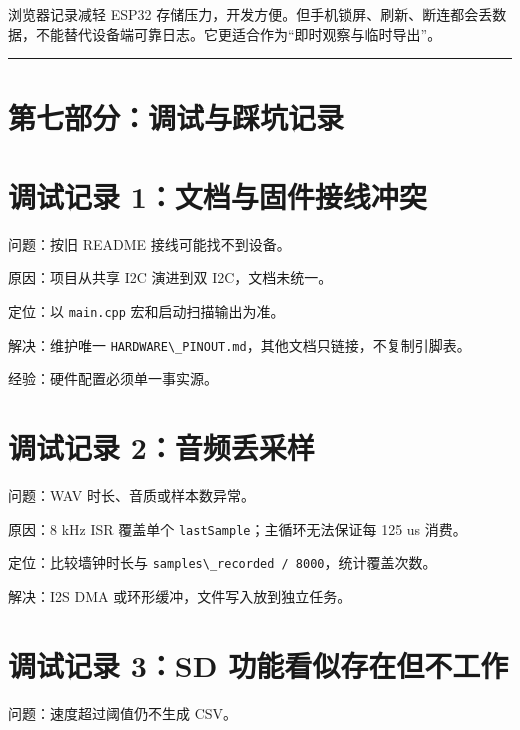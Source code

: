\documentclass[
  UTF8,11pt,a4paper]{ctexart}
\newcommand{\passthrough}[1]{#1}
\begin{document}
浏览器记录减轻 ESP32
存储压力，开发方便。但手机锁屏、刷新、断连都会丢数据，不能替代设备端可靠日志。它更适合作为``即时观察与临时导出''。

\begin{center}\rule{0.5\linewidth}{0.5pt}\end{center}

\section{第七部分：调试与踩坑记录}\label{ux7b2cux4e03ux90e8ux5206ux8c03ux8bd5ux4e0eux8e29ux5751ux8bb0ux5f55}

\section{调试记录
1：文档与固件接线冲突}\label{ux8c03ux8bd5ux8bb0ux5f55-1ux6587ux6863ux4e0eux56faux4ef6ux63a5ux7ebfux51b2ux7a81}

问题：按旧 README 接线可能找不到设备。

原因：项目从共享 I2C 演进到双 I2C，文档未统一。

定位：以 \passthrough{\lstinline!main.cpp!} 宏和启动扫描输出为准。

解决：维护唯一
\passthrough{\lstinline!HARDWARE\_PINOUT.md!}，其他文档只链接，不复制引脚表。

经验：硬件配置必须单一事实源。

\section{调试记录
2：音频丢采样}\label{ux8c03ux8bd5ux8bb0ux5f55-2ux97f3ux9891ux4e22ux91c7ux6837}

问题：WAV 时长、音质或样本数异常。

原因：8 kHz ISR 覆盖单个
\passthrough{\lstinline!lastSample!}；主循环无法保证每 125 us 消费。

定位：比较墙钟时长与
\passthrough{\lstinline!samples\_recorded / 8000!}，统计覆盖次数。

解决：I2S DMA 或环形缓冲，文件写入放到独立任务。

\section{调试记录 3：SD
功能看似存在但不工作}\label{ux8c03ux8bd5ux8bb0ux5f55-3sd-ux529fux80fdux770bux4f3cux5b58ux5728ux4f46ux4e0dux5de5ux4f5c}

问题：速度超过阈值仍不生成 CSV。
\end{document}
